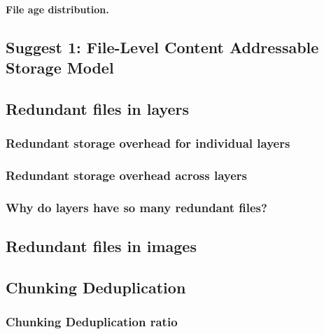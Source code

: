 \paragraph{File age distribution.}


\subsection{Suggest 1: File-Level Content Addressable Storage Model}


\subsection{Redundant files in layers}


\subsubsection{Redundant storage overhead for individual layers}


\subsubsection{Redundant storage overhead across layers}


\subsubsection{Why do layers have so many redundant files?}


\subsection{Redundant files in images}


\subsection{Chunking Deduplication}

\subsubsection{Chunking Deduplication ratio}
